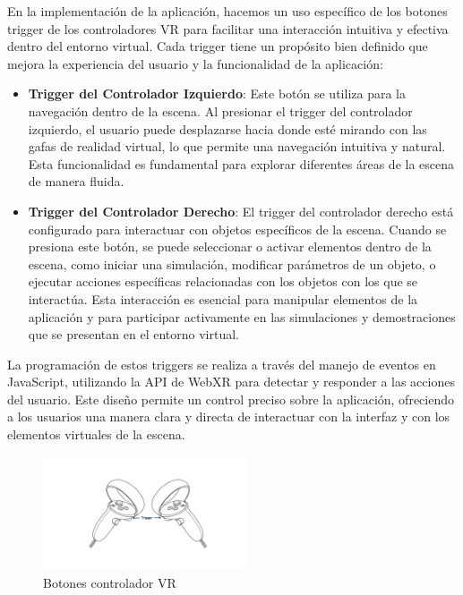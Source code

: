 \documentclass[a4paper, 12pt]{book}
\begin{document}
En la implementación de la aplicación, hacemos un uso específico de los botones trigger de los controladores VR para facilitar una interacción 
intuitiva y efectiva dentro del entorno virtual. Cada trigger tiene un propósito bien definido que mejora la experiencia del 
usuario y la funcionalidad de la aplicación:

\begin{itemize}
  \item \textbf{Trigger del Controlador Izquierdo}: Este botón se utiliza para la navegación dentro de la escena. Al presionar el trigger del controlador izquierdo, 
  el usuario puede desplazarse hacia donde esté mirando con las gafas de realidad virtual, lo que permite una navegación intuitiva y natural. 
  Esta funcionalidad es fundamental para explorar diferentes áreas de la escena de manera fluida.
  
  \item \textbf{Trigger del Controlador Derecho}: El trigger del controlador derecho está configurado para interactuar con objetos 
  específicos de la escena. Cuando se presiona este botón, se puede seleccionar o activar elementos dentro de la escena, 
  como iniciar una simulación, modificar parámetros de un objeto, o ejecutar acciones específicas relacionadas con los objetos con los que se interactúa. 
  Esta interacción es esencial para manipular elementos de la aplicación y para participar activamente en las simulaciones y demostraciones que se presentan en el entorno virtual.
\end{itemize}

La programación de estos triggers se realiza a través del manejo de eventos en JavaScript, utilizando la API de WebXR para detectar y responder 
a las acciones del usuario. Este diseño permite un control preciso sobre la aplicación, ofreciendo a los usuarios una manera clara y directa 
de interactuar con la interfaz y con los elementos virtuales de la escena.

\begin{figure}
  \centering
  \includegraphics[width=6cm, keepaspectratio]{img/BotonesControlador.png}
  \caption{Botones controlador VR}
  \label{fig:controladorBotones}
\end{figure}
\end{document}
